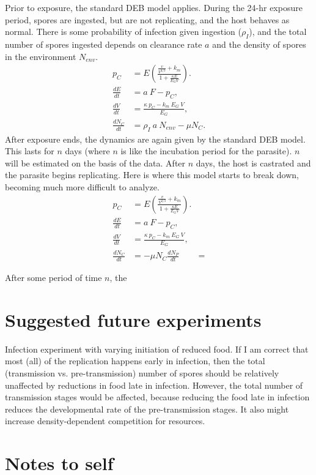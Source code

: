 \documentclass[11pt,reqno,final,pdftex]{amsart}\usepackage[]{graphicx}\usepackage[]{color}
\theoremstyle{plain}
\numberwithin{equation}{part}
\begin{document}
Prior to exposure, the standard DEB model applies.
During the 24-hr exposure period, spores are ingested, but are not replicating, and the host behaves as normal.
There is some probability of infection given ingestion ($\rho_I$), and the total number of spores ingested depends on clearance rate $a$ and the density of spores in the environment $N_{env}$.
\begin{align}
p_C &= E \left(\frac{\frac{v}{V^{2/3}} + k_m}{1+\frac{\kappa E}{E_G V}}\right). \\
\frac{dE}{dt} &= a~F - p_C, \\
\frac{dV}{dt} &= \frac{\kappa~p_C - k_m~E_G~V}{E_G}, \\
\frac{dN_C}{dt} &=\rho_I~a~N_{env} - \mu N_C.
\end{align}
After exposure ends, the dynamics are again given by the standard DEB model.
This lasts for $n$ days (where $n$ is like the incubation period for the parasite).
$n$ will be estimated on the basis of the data.
After $n$ days, the host is castrated and the parasite begins replicating.
Here is where this model starts to break down, becoming much more difficult to analyze.
\begin{align}
p_C &= E \left(\frac{\frac{v}{V^{2/3}} + k_m}{1+\frac{\kappa E}{E_G V}}\right). \\
\frac{dE}{dt} &= a~F - p_C, \\
\frac{dV}{dt} &= \frac{\kappa~p_C - k_m~E_G~V}{E_G}, \\
\frac{dN_C}{dt} &= -\mu N_C
\frac{dN_P}{dt} &=
\end{align}


After some period of time $n$, the



\section*{Suggested future experiments}
Infection experiment with varying initiation of reduced food.
If I am correct that most (all) of the replication happens early in infection, then the total (transmission vs. pre-transmission) number of spores should be relatively unaffected by reductions in food late in infection.
However, the total number of transmission stages would be affected, because reducing the food late in infection reduces the developmental rate of the pre-transmission stages.
It also might increase density-dependent competition for resources.

\section*{Notes to self}
\end{document}
